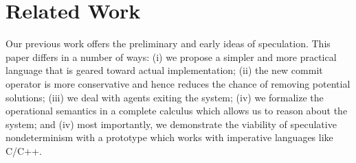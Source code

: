 \section{Related Work}\label{sec:related}

Our previous work \cite{Jaffar05:coma,JaffarYZ07}
offers the preliminary and early ideas of speculation. 
This paper differs in a number of ways: 
(i) we propose a simpler and more practical language that is geared
toward actual implementation;
(ii) the new commit operator is more conservative and hence reduces
the chance of removing potential solutions;
(iii) we deal with agents exiting the system;
(iv) we formalize the operational semantics in 
a complete calculus which allows us to reason about the system;
and (iv) most importantly, we demonstrate the viability of speculative
nondeterminism with a prototype which works with imperative languages 
like C/C++.
%

